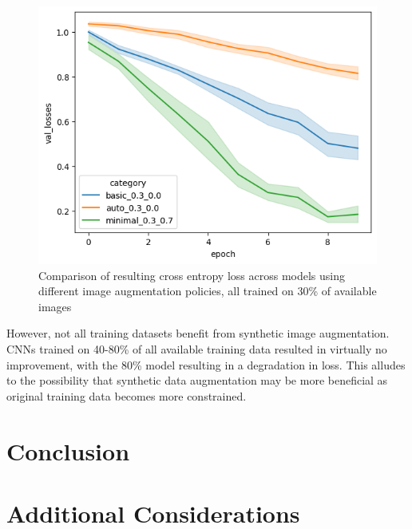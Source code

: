 \documentclass [MS] {uclathes}
\begin{document}
\begin{figure}[H]
    \centering
    \includegraphics[width=0.7\linewidth]{figures/image_augmentation_comparison.png}
    \caption{Comparison of resulting cross entropy loss across models using different image augmentation policies, all 
    trained on 30\% of available images}
    \label{fig:enter-label}
\end{figure}
However, not all training datasets benefit from synthetic image augmentation. CNNs trained on 40-80\% of all available 
training data resulted in virtually no improvement, with the 80\% model resulting in a degradation in loss. This alludes 
to the possibility that synthetic data augmentation may be more beneficial as original training data becomes more 
constrained.

\chapter{Conclusion}

\chapter{Additional Considerations}
\end{document}
